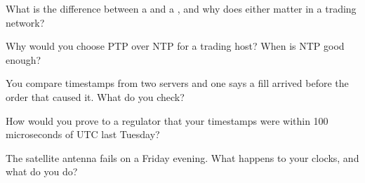 \begin{interviewq}\label{iq:nw:time-synchronisation:2}
What is the difference between a  and a , and why does either matter in a trading network?
\end{interviewq}

\begin{interviewq}\label{iq:nw:time-synchronisation:3}
Why would you choose PTP over NTP for a trading host? When is NTP good enough?
\end{interviewq}

\begin{interviewq}\label{iq:nw:time-synchronisation:4}
You compare timestamps from two servers and one says a fill arrived before the order that caused it. What do you check?
\end{interviewq}

\begin{interviewq}\label{iq:nw:time-synchronisation:5}
How would you prove to a regulator that your timestamps were within 100 microseconds of UTC last Tuesday?
\end{interviewq}

\begin{interviewq}\label{iq:nw:time-synchronisation:6}
The satellite antenna fails on a Friday evening. What happens to your clocks, and what do you do?
\end{interviewq}
